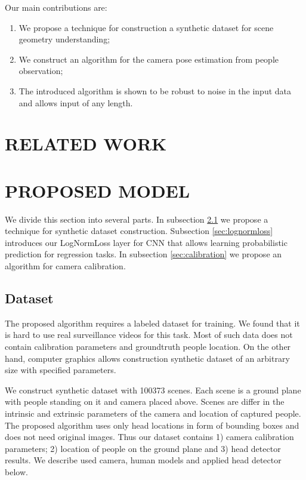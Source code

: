 Our main contributions are:
\begin{enumerate}
	\item We propose a technique for construction a synthetic dataset for scene geometry understanding;
	\item We construct an algorithm for the camera pose estimation from people observation;
	\item The introduced algorithm is shown to be robust to noise in the input data and allows input of any length.
\end{enumerate}

\section{\uppercase{Related Work}}
\label{sec:related}

\noindent 

\section{\uppercase{Proposed Model}}
\label{sec:proposed}

\noindent We divide this section into several parts. In subsection \ref{sec:dataset} we propose a technique for synthetic dataset construction. Subsection \ref{sec:lognormloss} introduces our LogNormLoss layer for CNN that allows learning probabilistic prediction for regression tasks. In subsection \ref{sec:calibration} we propose an algorithm for camera calibration.

\subsection{Dataset}
\label{sec:dataset}

\noindent The proposed algorithm requires a labeled dataset for training. We found that it is hard to use real surveillance videos for this task. Most of such data does not contain calibration parameters and groundtruth people location. On the other hand, computer graphics allows construction synthetic dataset of an arbitrary size with specified parameters.

We construct synthetic dataset with 100373 scenes. Each scene is a ground plane with people standing on it and camera placed above. Scenes are differ in the intrinsic and extrinsic parameters of the camera and location of captured people. The proposed algorithm uses only head locations in form of bounding boxes and does not need original images. Thus our dataset contains 1) camera calibration parameters; 2) location of people on the ground plane and 3) head detector results. We describe used camera, human models and applied head detector below.

